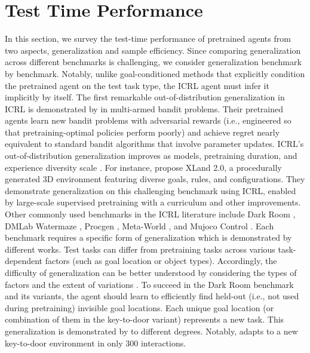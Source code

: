 \documentclass{article}
\begin{document}
\section{Test Time Performance} \label{sec: generalization}
In this section,
we survey the test-time performance of pretrained agents from two aspects, generalization and sample efficiency.
Since comparing generalization across different benchmarks is challenging, we consider generalization benchmark by benchmark.
Notably, unlike goal-conditioned methods that explicitly condition the pretrained agent on the test task type,
the ICRL agent must infer it implicitly by itself.
The first remarkable out-of-distribution generalization in ICRL
is demonstrated by \citet{laskinContextReinforcementLearning2022} in multi-armed bandit problems.
Their pretrained agents learn new bandit problems with adversarial rewards (i.e., engineered so that pretraining-optimal policies perform poorly) and achieve regret nearly equivalent to standard bandit algorithms that involve parameter updates.
ICRL’s out-of-distribution generalization improves as models, pretraining duration, and experience diversity scale \citep{teamHumanTimescaleAdaptationOpenEnded2023,kirschGeneralPurposeContextLearning2023}.
For instance,
\citet{teamHumanTimescaleAdaptationOpenEnded2023} propose XLand 2.0, a procedurally generated 3D environment featuring diverse goals, rules, and configurations. They demonstrate generalization on this challenging benchmark using ICRL, enabled by large-scale supervised pretraining with a curriculum and other improvements.
Other commonly used benchmarks in the ICRL literature include
Dark Room \citep{laskinContextReinforcementLearning2022}, DMLab Watermaze \citep{laskinContextReinforcementLearning2022}, Procgen \citep{cobbe2019procgen}, Meta-World \citep{yuMetaWorldBenchmarkEvaluation2021}, and Mujoco Control \citep{todorov2012mujoco}.
Each benchmark requires a specific form of generalization which is demonstrated by different works.
Test tasks can differ from pretraining tasks across various task-dependent factors (such as goal location or object types). Accordingly, the difficulty of generalization can be better understood by considering the types of factors and the extent of variations \citep{kirkSurveyZeroshotGeneralisation2023}.
To succeed in the Dark Room benchmark and its variants, the agent should learn to efficiently find held-out (i.e., not used during pretraining) invisible goal locations.
Each unique goal location (or combination of them in the key-to-door variant) represents a new task.
This generalization is demonstrated by \citet{laskinContextReinforcementLearning2022,leeSupervisedPretrainingCan2023,huangContextDecisionTransformer2024,huangDecisionMambaReinforcement2024,siniiContextReinforcementLearning2024,zismanEmergenceContextReinforcement2023,zismanNGramInductionHeads2024,kirschGeneralPurposeContextLearning2023,daiContextExplorationExploitationReinforcement2024,grigsbyAMAGOScalableContext2024,elawadyReLICRecipe64k2024} to different degrees. Notably, \citet{grigsbyAMAGOScalableContext2024} adapts to a new key-to-door environment in only 300 interactions.
\end{document}
